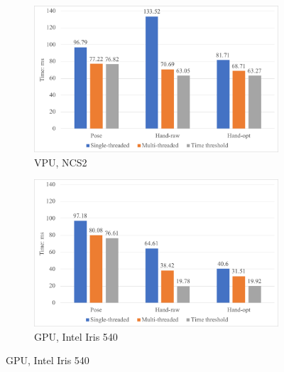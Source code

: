 \begin{figure}[htp]
    \centering
    \begin{subfigure}{0.49\textwidth}
    \includegraphics[width=\textwidth]{figure/VPU_stats.pdf}
    \caption{VPU, NCS2}\label{subfig:vpu}
    \end{subfigure}
    \begin{subfigure}{0.49\textwidth}
    \includegraphics[width=\textwidth]{figure/GPU_stats.pdf}
    \caption{GPU, Intel Iris 540}
    \end{subfigure}
    \label{fig:stats_pu}\label{subfig:gpu}
\end{figure}

